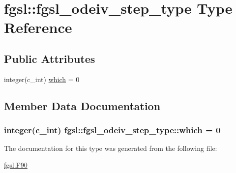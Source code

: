 \hypertarget{structfgsl_1_1fgsl__odeiv__step__type}{\section{fgsl\-:\-:fgsl\-\_\-odeiv\-\_\-step\-\_\-type Type Reference}
\label{structfgsl_1_1fgsl__odeiv__step__type}
}
\subsection*{Public Attributes}
\begin{DoxyCompactItemize}
\item 
integer(c\-\_\-int) \hyperlink{structfgsl_1_1fgsl__odeiv__step__type_abbb772a097d345b8bd0a4d190878720a}{which} = 0
\end{DoxyCompactItemize}


\subsection{Member Data Documentation}
\hypertarget{structfgsl_1_1fgsl__odeiv__step__type_abbb772a097d345b8bd0a4d190878720a}{
\subsubsection[{which}]{\setlength{\rightskip}{0pt plus 5cm}integer(c\-\_\-int) fgsl\-::fgsl\-\_\-odeiv\-\_\-step\-\_\-type\-::which = 0}}\label{structfgsl_1_1fgsl__odeiv__step__type_abbb772a097d345b8bd0a4d190878720a}


The documentation for this type was generated from the following file\-:\begin{DoxyCompactItemize}
\item 
\hyperlink{fgsl_8F90}{fgsl.\-F90}\end{DoxyCompactItemize}
